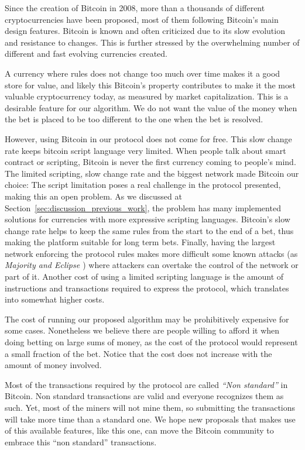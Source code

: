 Since the creation of Bitcoin in 2008, more than a thousands of different
  cryptocurrencies have been proposed, most of them following Bitcoin's main
  design features.
Bitcoin is known and often criticized due to its slow evolution and resistance
  to changes.
This is further stressed by the overwhelming number of different and fast
  evolving currencies created.

A currency where rules does not change too much over time makes it a good store
  for value, and likely this Bitcoin's property contributes to make it the
  most valuable cryptocurrency today, as measured by market capitalization.
This is a desirable feature for our algorithm.
We do not want the value of the money when the bet is placed to be too different
  to the one when the bet
  is resolved.

However, using Bitcoin in our protocol does not come for free.
This slow change rate keeps bitcoin script language very limited.
When people talk about smart contract or scripting, Bitcoin is never the first
  currency coming to people's mind.
The limited scripting, slow change rate and the biggest network made Bitcoin our
  choice:
The script limitation poses a real challenge in the protocol presented, making
  this an open problem.
As we discussed at Section~\ref{sec:discussion_previous_work}, the problem has
  many implemented solutions for currencies with more expressive scripting
  languages.
Bitcoin's slow change rate helps to keep the same rules from the start to the
  end of a bet, thus making the platform suitable for long term bets.
Finally, having the largest network enforcing the protocol rules makes more
  difficult some known attacks (as \emph{Majority and Eclipse
  \cite{heilman2015eclipse}}) where attackers can overtake the control of the
  network or part of it.
Another cost of using a limited scripting language is the amount of instructions
  and transactions required to express the protocol, which translates into
  somewhat higher costs.

The cost of running our proposed algorithm may be prohibitively expensive for
  some cases.
Nonetheless we believe there are people willing to afford it when doing betting
  on large sums of money, as the cost of the protocol would represent a small
  fraction of the bet.
Notice that the cost does not increase with the amount of money involved.

Most of the transactions required by the protocol are called
  \emph{``Non standard''} in Bitcoin.
Non standard transactions are valid and everyone recognizes them as such.
Yet, most of the miners will not mine them, so submitting the transactions
  will take more time than a standard one.
We hope new proposals that makes use of this available features, like this one,
  can move the Bitcoin community to embrace this ``non standard'' transactions.

